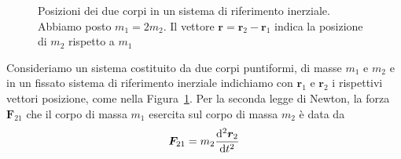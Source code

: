 \begin{figure}
  \centering
  \caption[Posizioni dei due corpi in un sistema di riferimento
  inerziale]{Posizioni dei due corpi in un sistema di riferimento
    inerziale. Abbiamo posto $m_1 = 2 m_2$. Il vettore
    $\bm{r} = \bm{r}_2 - \bm{r}_1$ indica la posizione di $m_2$ rispetto a
    $m_1$}
  \label{fig:due-corpi}
\end{figure}
Consideriamo un sistema costituito da due corpi puntiformi, di masse $m_1$ e
$m_2$ e in un fissato sistema di riferimento inerziale indichiamo con $\bm{r}_1$
e $\bm{r}_2$ i rispettivi vettori posizione, come nella
Figura~\ref{fig:due-corpi}. Per la seconda legge di Newton, la forza
$\bm{F}_{21}$ che il corpo di massa $m_1$ esercita sul corpo di massa $m_2$ è
data da
\begin{equation}
  \label{eq:f21}
  \bm{F}_{21} = m_2\toder[2]{\bm{r}_2}{t}
\end{equation}
